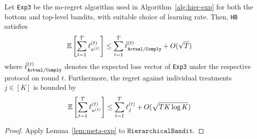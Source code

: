\begin{thm}\label{thm:cexp}\eod
	Let \texttt{Exp3} be the no-regret algorithm used in Algorithm~\ref{alg:hier-exp} for both the bottom and top-level bandits, with suitable choice of learning rate. Then, \texttt{HB} satisfies
	\begin{equation}
		\operatorname*{\mathbb E}\left[\sum_{t=1}^T\ell^{(t)}_{a^{(t)}}\right]
		\leq \sum_{t=1}^T \tilde{\ell}^{(t)}_{{\texttt{Actual}}/{\texttt{Comply}}}
		+ O(\sqrt{T})
	\end{equation}
	where $\tilde{\ell}^{(t)}_{{\texttt{Actual}}/{\texttt{Comply}}}$ denotes the expected loss vector of \texttt{Exp3} under the respective protocol on round $t$. 
	Furthermore, the regret against individual treatments $j\in[K]$ is bounded by
	\begin{equation}
		\operatorname*{\mathbb E}\left[\sum_{t=1}^{T} \ell^{(t)}_{a^{(t)}}\right]
		\leq \sum_{t=1}^T\ell^{(t)}_{j}
		+ O(\sqrt{T K\log K})
	\end{equation}
\end{thm}

\begin{proof}
	Apply Lemma~\ref{lem:meta-exp} to $\texttt{HierarchicalBandit}$.
\end{proof}



